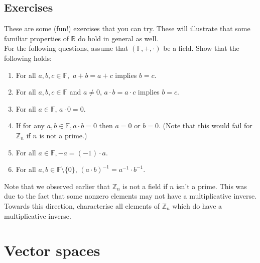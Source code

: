 \documentclass{article}
\begin{document}
\subsection{Exercises}
These are some (fun!) exercises that you can try. These will illustrate that some familiar properties of $\mathbb{R}$ do hold in general as well. \\
For the following questions, assume that $(\mathbb{F}, +, \cdot)$ be a field. Show that the following holds:
\begin{enumerate}[nosep] 
	\item For all $a, b, c \in \mathbb{F},$ $a+b=a+c$ implies $b=c$.
    \item For all $a, b, c \in \mathbb{F}$ and $a\neq0$, $a\cdot b = a\cdot c$ implies $b=c$.
    \item For all $ a\in \mathbb{F}$, $a\cdot 0 = 0$.
    \item If for any $a, b \in \mathbb{F}, a\cdot b=0$ then $a=0$ or $b=0$. (Note that this would fail for $\mathbb{Z}_n$ if $n$ is not a prime.)
    \item For all $a \in \mathbb{F}, -a = (-1)\cdot a$.
    \item For all $a, b \in \mathbb{F} \setminus \{0\}$, $(a\cdot b)^{-1} = a^{-1}\cdot b^{-1}.$
\end{enumerate}
Note that we observed earlier that $\mathbb{Z}_n$ is not a field if $n$ isn't a prime. This was due to the fact that some nonzero elements may not have a multiplicative inverse. Towards this direction, characterise all elements of $\mathbb{Z}_n$ which do have a multiplicative inverse.

\section{Vector spaces}
\end{document}
